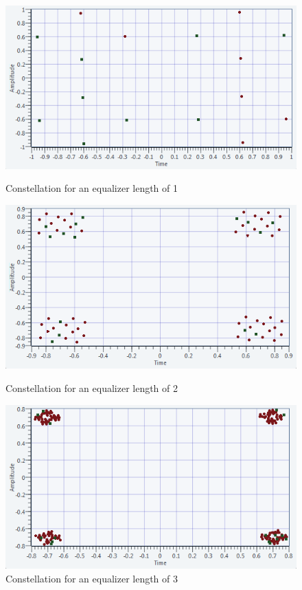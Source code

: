 \documentclass[frenchb, oneside, headings=normal]{scrartcl}
\begin{document}
\begin{figure}[ht]
    \begin{minipage}[b]{0.48\linewidth}
        \centering \includegraphics[scale=0.6]{img/ISI-1.png}
    \caption{Constellation for an equalizer length of 1}
    \label{fig1}
    
    \end{minipage}\hfill
    \begin{minipage}[b]{0.48\linewidth}
         \centering \includegraphics[scale=0.6]{img/ISI-2.png}
        \caption{Constellation for an equalizer length of 2}
        \label{fig2}
    \end{minipage}
    \begin{minipage}[b]{0.48\linewidth}
        \centering \includegraphics[scale=0.6]{img/ISI-3.png}
    \caption{Constellation for an equalizer length of 3}
    \label{fig3}
    

\end{minipage}
\end{figure}
\end{document}
